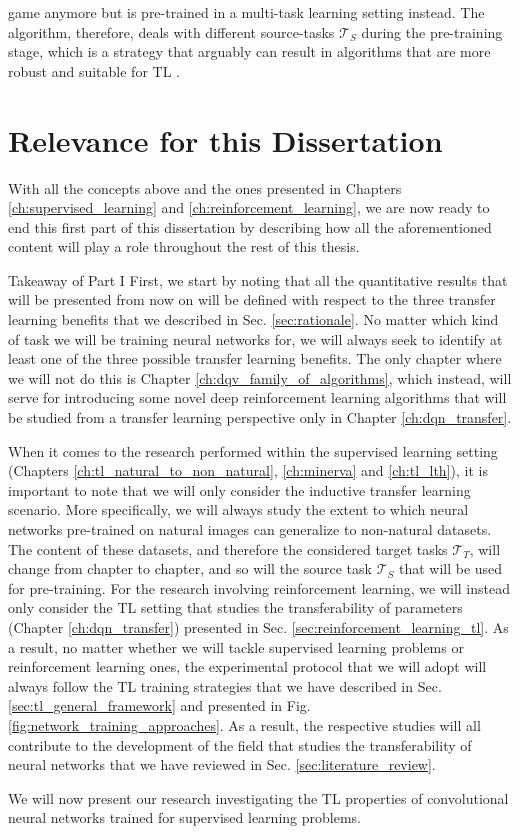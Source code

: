 game anymore but is pre-trained in a multi-task learning setting instead. The algorithm, therefore, deals with different source-tasks $\mathcal{T}_S$ during the pre-training stage, which is a strategy that arguably can result in algorithms that are more robust and suitable for TL \cite{kirkpatrick2017overcoming}.  


\section{Relevance for this Dissertation}
\label{sec:relevance}

With all the concepts above and the ones presented in Chapters \ref{ch:supervised_learning} and \ref{ch:reinforcement_learning}, we are now ready to end this first part of this dissertation by describing how all the aforementioned content will play a role throughout the rest of this thesis. 


\begin{takeaway}{Takeaway of Part I}
First, we start by noting that all the quantitative results that will be presented from now on will be defined with respect to the three transfer learning benefits that we described in Sec. \ref{sec:rationale}. No matter which kind of task we will be training neural networks for, we will always seek to identify at least one of the three possible transfer learning benefits. The only chapter where we will not do this is Chapter \ref{ch:dqv_family_of_algorithms}, which instead, will serve for introducing some novel deep reinforcement learning algorithms that will be studied from a transfer learning perspective only in Chapter \ref{ch:dqn_transfer}.

When it comes to the research performed within the supervised learning setting (Chapters \ref{ch:tl_natural_to_non_natural}, \ref{ch:minerva} and \ref{ch:tl_lth}), it is important to note that we will only consider the inductive transfer learning scenario. More specifically, we will always study the extent to which neural networks pre-trained on natural images can generalize to non-natural datasets. The content of these datasets, and therefore the considered target tasks $\mathcal{T}_T$, will change from chapter to chapter, and so will the source task $\mathcal{T}_S$ that will be used for pre-training. For the research involving reinforcement learning, we will instead only consider the TL setting that studies the transferability of parameters (Chapter \ref{ch:dqn_transfer}) presented in Sec. \ref{sec:reinforcement_learning_tl}. As a result, no matter whether we will tackle supervised learning problems or reinforcement learning ones, the experimental protocol that we will adopt will always follow the TL training strategies that we have described in Sec. \ref{sec:tl_general_framework} and presented in Fig. \ref{fig:network_training_approaches}. As a result, the respective studies will all contribute to the development of the field that studies the transferability of neural networks that we have reviewed in Sec. \ref{sec:literature_review}.
\end{takeaway}

We will now present our research investigating the TL properties of convolutional neural networks trained for supervised learning problems.
